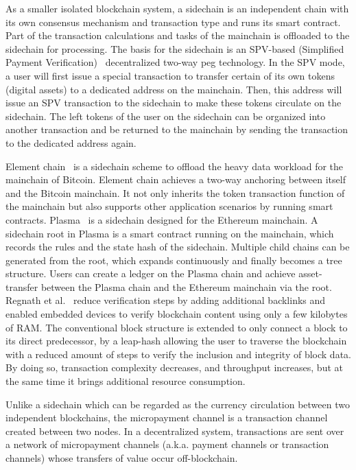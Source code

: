 \documentclass[acmsmall]{acmart}
\begin{document}
As a smaller isolated blockchain system, a sidechain is an independent chain with its own consensus mechanism and transaction type and runs its smart contract. Part of the transaction calculations and tasks of the mainchain is offloaded to the sidechain for processing.
The basis for the sidechain is an SPV-based (Simplified Payment Verification)~\cite{back2014enabling}  decentralized two-way peg technology. In the SPV mode, a user will first issue a special transaction to transfer certain of its own tokens (digital assets) to a dedicated address on the mainchain. Then, this address will issue an SPV transaction to the sidechain to make these tokens circulate on the sidechain. The left tokens of the user on the sidechain can be organized into another transaction and be returned to the mainchain by sending the transaction to the dedicated address again. 

Element chain~\cite{back2014enabling} is a sidechain scheme to offload the heavy data workload for the mainchain of Bitcoin. Element chain achieves a two-way anchoring between itself and the Bitcoin mainchain. It not only inherits the token transaction function of the mainchain but also supports other application scenarios by running smart contracts. Plasma~\cite{poon2017plasma} is a sidechain designed for the Ethereum mainchain. A sidechain root in Plasma is a smart contract running on the mainchain, which records the rules and the state hash of the sidechain. Multiple child chains can be generated from the root, which expands continuously and finally becomes a tree structure. Users can create a ledger on the Plasma chain and achieve asset-transfer between the Plasma chain and the Ethereum mainchain via the root.
Regnath et al.~\cite{DBLP:conf/iccad/RegnathS18} reduce verification steps by adding additional backlinks and enabled embedded devices to verify blockchain content using only a few kilobytes of RAM. The conventional block structure is extended to only connect a block to its direct predecessor, by a leap-hash allowing the user to traverse the blockchain with a reduced amount of steps to verify the inclusion and integrity of block data. By doing so, transaction complexity decreases, and throughput increases, but at the same time it brings additional resource consumption.



Unlike a sidechain which can be regarded as the currency circulation between two independent blockchains, the micropayment channel is a transaction channel created between two nodes.  In a decentralized system, transactions are sent over a network of micropayment channels (a.k.a. payment channels or transaction channels) whose transfers of value occur off-blockchain. 
\end{document}
